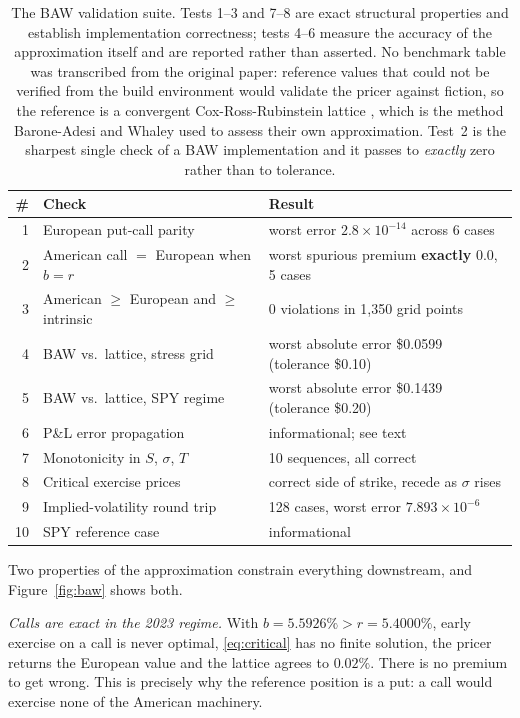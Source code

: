\documentclass[11pt]{article}
\begin{document}
\begin{table}[t]
\centering
\small
\caption{The BAW validation suite. Tests 1--3 and 7--8 are exact structural properties and
establish implementation correctness; tests 4--6 measure the accuracy of the
approximation itself and are reported rather than asserted. No benchmark table was
transcribed from the original paper: reference values that could not be verified from
the build environment would validate the pricer against fiction, so the reference is a
convergent Cox-Ross-Rubinstein lattice \citep{crr1979}, which is the method
Barone-Adesi and Whaley used to assess their own approximation. Test~2 is the sharpest
single check of a BAW implementation and it passes to \emph{exactly} zero rather than to
tolerance.}
\label{tab:baw}
\begin{tabular}{rlp{}}
\toprule
\# & Check & Result \\
\midrule
1 & European put-call parity & worst error $2.8\times10^{-14}$ across 6 cases \\
2 & American call $=$ European when $b=r$ & worst spurious premium \textbf{exactly} $0.0$, 5 cases \\
3 & American $\ge$ European and $\ge$ intrinsic & 0 violations in 1{,}350 grid points \\
4 & BAW vs.\ lattice, stress grid & worst absolute error \$0.0599 (tolerance \$0.10) \\
5 & BAW vs.\ lattice, SPY regime & worst absolute error \$0.1439 (tolerance \$0.20) \\
6 & P\&L error propagation & informational; see text \\
7 & Monotonicity in $S$, $\sigma$, $T$ & 10 sequences, all correct \\
8 & Critical exercise prices & correct side of strike, recede as $\sigma$ rises \\
9 & Implied-volatility round trip & 128 cases, worst error $7.893\times10^{-6}$ \\
10 & SPY reference case & informational \\
\bottomrule
\end{tabular}
\end{table}

Two properties of the approximation constrain everything downstream, and
Figure~\ref{fig:baw} shows both.

\emph{Calls are exact in the 2023 regime.} With $b=5.5926\%>r=5.4000\%$, early exercise
on a call is never optimal, \eqref{eq:critical} has no finite solution, the pricer
returns the European value and the lattice agrees to $0.02\%$. There is no premium to get
wrong. This is precisely why the reference position is a put: a call would exercise none
of the American machinery.
\end{document}

